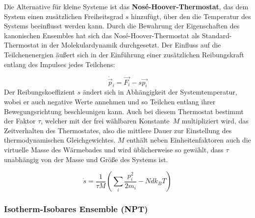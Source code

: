 
Die Alternative für kleine Systeme ist das \textbf{Nosé-Hoover-Thermostat}\cite{nose_unified_1984,hoover_canonical_1985}, das dem System einen zusätzlichen Freiheitsgrad $s$ hinzufügt, über den die Temperatur des Systems beeinflusst werden kann.
Durch die Bewahrung der Eigenschaften des kanonischen Ensembles hat sich das Nosé-Hoover-Thermostat als Standard-Thermostat in der Molekulardynamik durchgesetzt.
Der Einfluss auf die Teilchenenergien äußert sich in der Einführung einer zusätzlichen Reibungskraft entlang des Impulses jedes Teilchens:

\begin{equation}
  \dot{\vec{p}}_i = \vec{F_i} - s \vec{p_i}
\end{equation}
Der Reibungskoeffizient $s$ ändert sich in Abhängigkeit der Systemtemperatur, wobei er auch negative Werte annehmen und so Teilchen entlang ihrer Bewegungsrichtung beschleunigen kann.
Auch bei diesem Thermostat bestimmt der Faktor $\tau$, welcher mit der frei wählbaren Konstante~$M$ multipliziert wird, das Zeitverhalten des Thermostates, also die mittlere Dauer zur Einstellung des thermodynamischen Gleichgewichtes.
$M$ enthält neben Einheitenfaktoren auch die virtuelle Masse des Wärmebades und wird üblicherweise so gewählt, dass $\tau$ unabhängig von der Masse und Größe des Systems ist.

\begin{equation}
  \dot s = \frac{1}{\tau M} \left(\sum_i{\frac{p_i^2}{2m_i}} - N d k_B T\right)
\end{equation}

\subsubsection{Isotherm-Isobares Ensemble (NPT)}

